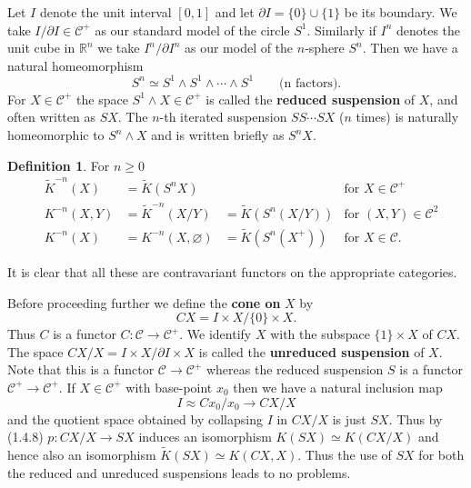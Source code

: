 \documentclass[leqno]{book}
\numberwithin{equation}{section}
\theoremstyle{definition}
\newtheorem{definition}[theorem]{Definition}
\renewcommand{\emph}{\textbf}
\begin{document}
            Let $I$ denote the unit interval $[0,1]$ and let $\partial I=\{0\}\cup \{1\}$ be its boundary. We take $I/\partial I\in \mathcal{C}^{+}$ as our standard model of the circle $S^{1}$. Similarly if $I^{n}$ denotes the unit cube in $\mathbb{R}^{n}$ we take $I^{n}/\partial I^{n}$ as our model of the $n$-sphere $S^{n}$. Then we have a natural homeomorphism
            \begin{equation*}
              S^{n}\simeq S^{1}\wedge S^{1}\wedge \cdots \wedge S^{1} \qquad \text{(n factors)}.
            \end{equation*}
            For $X \in \mathcal{C}^{+}$ the space $S^{1}\wedge X \in \mathcal{C}^{+}$ is called the \emph{reduced suspension} of $X$, and often written as $SX$. The $n$-th iterated suspension $SS\cdots SX$ ($n$ times) is naturally homeomorphic to $S^{n}\wedge X$ and is written briefly as $S^{n}X$.

            \setcounter{theorem}{1}
            \begin{definition}
              For $n \geq 0$
              \begin{equation*}
                \begin{aligned}
                  &\tilde{K}^{-n}(X) &= \tilde{K}(S^{n}X) & &\text{for }X \in \mathcal{C}^{+} \\
                  &K^{-n}(X,Y) &= \tilde{K}^{-n}(X/Y) &= \tilde{K}(S^{n}(X/Y)) &\text{for }(X,Y)\in \mathcal{C}^{2} \\
                  &K^{-n}(X) &= K^{-n}(X,\varnothing) &= \tilde{K}(S^{n}(X^{+})) &\text{for } X \in \mathcal{C}.
                \end{aligned}
              \end{equation*}
            \end{definition}

            It is clear that all these are contravariant functors on the appropriate categories.

            Before proceeding further we define the \emph{cone on} $X$ by
            \begin{equation*}
              CX = I\times X/\{0\}\times X.
            \end{equation*}
            Thus $C$ is a functor $C:\mathcal{C}\to \mathcal{C}^{+}$. We identify $X$ with the subspace $\{1\}\times X$ of $CX$. The space $CX/X=I\times X / \partial I\times X$ is called the \emph{unreduced suspension} of $X$. Note that this is a functor $\mathcal{C}\to \mathcal{C}^{+}$ whereas the reduced suspension $S$ is a functor $\mathcal{C}^{+}\to \mathcal{C}^{+}$. If $X \in \mathcal{C}^{+}$ with base-point $x_{0}$ then we have a natural inclusion map
            \begin{equation*}
              I \approx Cx_0/x_0 \to CX/X 
            \end{equation*}
            and the quotient space obtained by collapsing $I$ in $CX / X$ is just $SX$. Thus by (1.4.8) $p:CX /X \to SX$ induces an isomorphism $K(SX)\simeq K(CX / X)$ and hence also an isomorphism $\tilde{K}(SX)\simeq K(CX,X)$. Thus the use of $SX$ for both the reduced and unreduced suspensions leads to no problems.
\end{document}
